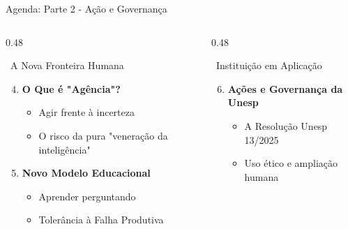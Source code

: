\documentclass[aspectratio=169,12pt]{beamer}
\begin{document}
\begin{frame}[shrink]{Agenda: Parte 2 - Ação e Governança}
    \begin{columns}[T]
        \begin{column}{0.48\textwidth}
            \begin{block}{\faListOl\, A Nova Fronteira Humana}
                \begin{enumerate}
                    \setcounter{enumi}{3}
                    \item \textbf{O Que é "Agência"?}
                    \begin{itemize}
                        \item Agir frente à incerteza
                        \item O risco da pura "veneração da inteligência"
                    \end{itemize}
                    
                    \item \textbf{Novo Modelo Educacional}
                    \begin{itemize}
                        \item Aprender perguntando
                        \item Tolerância à Falha Produtiva
                    \end{itemize}
                \end{enumerate}
            \end{block}
        \end{column}

        \begin{column}{0.48\textwidth}
            \begin{block}{\faListOl\, Instituição em Aplicação}
                \begin{enumerate}
                    \setcounter{enumi}{5}
                    \item \textbf{Ações e Governança da Unesp}
                    \begin{itemize}
                        \item A Resolução Unesp 13/2025
                        \item Uso ético e ampliação humana
                    \end{itemize}
                    

\end{enumerate}
\end{block}
\end{column}
\end{columns}
\end{frame}
\end{document}
